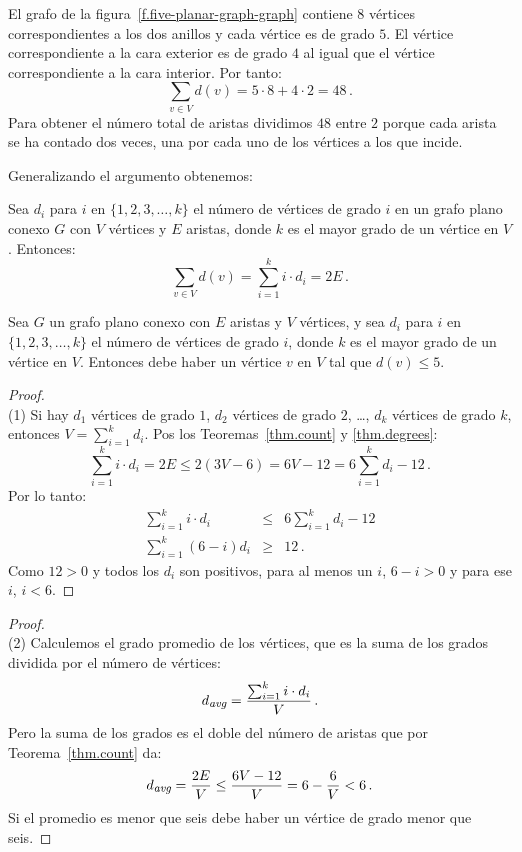 \begin{example}
El grafo de la figura~\ref{f.five-planar-graph-graph} contiene $8$ vértices correspondientes a los dos anillos y cada vértice es de grado $5$. El vértice correspondiente a la cara exterior es de grado $4$ al igual que el vértice correspondiente a la cara interior. Por tanto:
\[
\sum_{v\in V} d(v) = 5\cdot 8 + 4\cdot 2=48\,.
\]
Para obtener el número total de aristas dividimos $48$ entre $2$ porque cada arista se ha contado dos veces, una por cada uno de los vértices a los que incide.
\end{example}

Generalizando el argumento obtenemos:
\begin{theorem}\label{thm.degrees}
Sea $d_i$ para $i$ en $\{1,2,3,\ldots,k\}$ el número de vértices de grado $i$ en un grafo plano conexo $G$ con $V$ vértices y $E$ aristas, donde $k$ es el mayor grado de un vértice en $V$. Entonces:
\[
\sum_{v\in V} d(v) =\sum_{i=1}^{k} i\cdot d_i=2E\,.
\]
\end{theorem}

\begin{theorem}\label{thm.degree5}
Sea $G$ un grafo plano conexo con $E$ aristas y $V$ vértices, y sea $d_i$ para $i$ en $\{1,2,3,\ldots,k\}$ el número de vértices de grado $i$, donde $k$ es el mayor grado de un vértice en $V$. Entonces debe haber un vértice $v$ en $V$ tal que $d(v) \leq 5$.
\end{theorem}

\begin{proof}
\mbox{}\\
(1)
Si hay $d_1$ vértices de grado $1$, $d_2$ vértices de grado $2$, \ldots, $d_k$ vértices de grado $k$, entonces $V=\sum_{i=1}^{k}d_i$.  Pos los Teoremas~\ref{thm.count} y \ref{thm.degrees}:
\[
\sum_{i=1}^{k} i\cdot d_i=2E\leq 2(3V-6) = 6V-12=6\sum_{i=1}^{k} d_i -12\,.
\]
Por lo tanto:
\begin{eqnarray*}
\sum_{i=1}^{k} i\cdot d_i &\leq& 6\sum_{i=1}^{k} d_i -12\\
\sum_{i=1}^{k} (6-i)d_i&\geq& 12\,.
\end{eqnarray*}
Como $12>0$ y todos los $d_i$ son positivos, para al menos un $i$, $6-i>0$ y para ese $i$, $i<6$.
\end{proof}

\begin{proof}
\mbox{}\\
(2)
Calculemos el grado promedio de los vértices, que es la suma de los grados dividida por el número de vértices:
\[
d_{\textit{\footnotesize avg}}=\frac{\sum_{i=1}^{k} i\cdot d_i}{V}\,.
\]
Pero la suma de los grados es el doble del número de aristas que por Teorema~\ref{thm.count} da:
\[
d_{\textit{\footnotesize avg}}=\frac{2E}{V}\leq \frac{6V-12}{V}=6-\frac{6}{V}<6\,.
\]
Si el promedio es menor que seis debe haber un vértice de grado menor que seis.
\end{proof}

